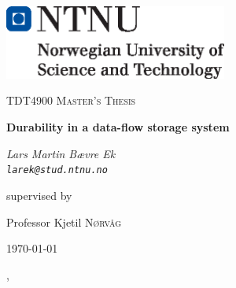 \documentclass[b5paper]{report}
\begin{document}
\begin{titlepage}
  \centering
	\includegraphics[width=0.55\textwidth]{ntnu}\par\vspace{1cm}
	{\scshape\Large TDT4900 Master's Thesis \par}
	\vspace{1.5cm}
	{\huge\bfseries Durability in a data-flow storage system\par}
	\vspace{2cm}
	{\Large\itshape Lars Martin Bævre Ek \\ \texttt{larek@stud.ntnu.no} \par}
	\vfill
	supervised by\par
  Professor Kjetil \textsc{Nørvåg}

	{\large \today\par}
\end{titlepage}



\tableofcontents
\pagebreak

\begin{abstract}
  
\end{abstract}

\ChTitleVar{\Huge\bfseries\rm}, \ChRuleWidth{1pt}










\appendix


\printbibliography
\end{document}
